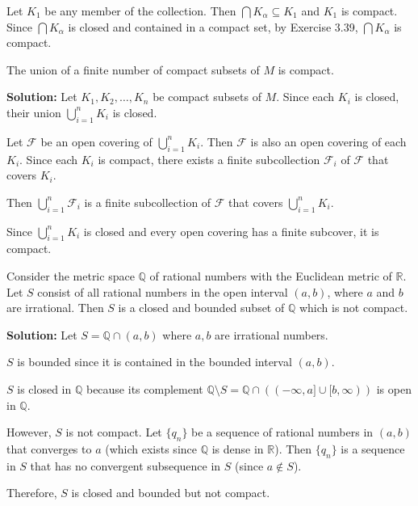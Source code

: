 Let $K_1$ be any member of the collection. Then $\bigcap K_\alpha \subseteq K_1$ and $K_1$ is compact. Since $\bigcap K_\alpha$ is closed and contained in a compact set, by Exercise 3.39, $\bigcap K_\alpha$ is compact.

\begin{problembox}
The union of a finite number of compact subsets of \( M \) is compact.
\end{problembox}

\textbf{Solution:} Let $K_1, K_2, \ldots, K_n$ be compact subsets of $M$. Since each $K_i$ is closed, their union $\bigcup_{i=1}^n K_i$ is closed.

Let $\mathcal{F}$ be an open covering of $\bigcup_{i=1}^n K_i$. Then $\mathcal{F}$ is also an open covering of each $K_i$. Since each $K_i$ is compact, there exists a finite subcollection $\mathcal{F}_i$ of $\mathcal{F}$ that covers $K_i$.

Then $\bigcup_{i=1}^n \mathcal{F}_i$ is a finite subcollection of $\mathcal{F}$ that covers $\bigcup_{i=1}^n K_i$.

Since $\bigcup_{i=1}^n K_i$ is closed and every open covering has a finite subcover, it is compact.

\begin{problembox}
Consider the metric space \( \mathbb{Q} \) of rational numbers with the Euclidean metric of \( \mathbb{R} \). Let \( S \) consist of all rational numbers in the open interval \((a, b)\), where \( a \) and \( b \) are irrational. Then \( S \) is a closed and bounded subset of \( \mathbb{Q} \) which is not compact.
\end{problembox}

\textbf{Solution:} Let $S = \mathbb{Q} \cap (a,b)$ where $a, b$ are irrational numbers.

$S$ is bounded since it is contained in the bounded interval $(a,b)$.

$S$ is closed in $\mathbb{Q}$ because its complement $\mathbb{Q} \setminus S = \mathbb{Q} \cap ((-\infty,a] \cup [b,\infty))$ is open in $\mathbb{Q}$.

However, $S$ is not compact. Let $\{q_n\}$ be a sequence of rational numbers in $(a,b)$ that converges to $a$ (which exists since $\mathbb{Q}$ is dense in $\mathbb{R}$). Then $\{q_n\}$ is a sequence in $S$ that has no convergent subsequence in $S$ (since $a \notin S$).

Therefore, $S$ is closed and bounded but not compact.

